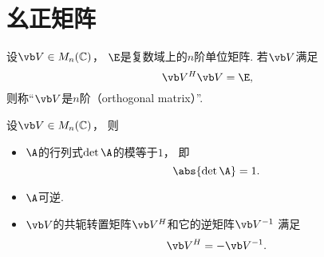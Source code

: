 \section{幺正矩阵}
\begin{definition}\label{definition:幺正矩阵.幺正矩阵的定义}
设\(\Q \in M_n(\mathbb{C})\)，
\(\E\)是复数域上的\(n\)阶单位矩阵.
若\(\Q\)满足\begin{equation}\label{equation:幺正矩阵.幺正矩阵的定义式}
	\Q^H \Q = \E,
\end{equation}
则称“\(\Q\)是\(n\)阶（orthogonal matrix）”.
\end{definition}

\begin{property}
设\(\Q \in M_n(\mathbb{C})\)，
则\begin{itemize}
	\item \(\A\)的行列式\(\det\A\)的模等于\(1\)，
	即\begin{equation}\label{equation:幺正矩阵.幺正矩阵的行列式}
		\abs{\det\A}=1.
	\end{equation}

	\item \(\A\)可逆.

	\item \(\Q\)的共轭转置矩阵\(\Q^H\)和它的逆矩阵\(\Q^{-1}\)
	满足\begin{equation}\label{equation:幺正矩阵.幺正矩阵的转置等于幺正矩阵的逆}
		\Q^H = -\Q^{-1}.
	\end{equation}
\end{itemize}
\end{property}

